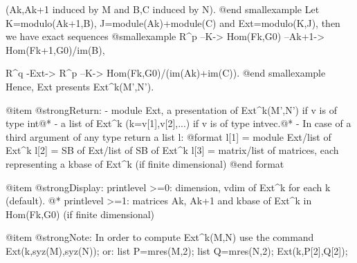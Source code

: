       (Ak,Ak+1 induced by M and B,C induced by N).
@end smallexample
Let K=modulo(Ak+1,B), J=module(Ak)+module(C) and Ext=modulo(K,J),
then we have exact sequences
@smallexample
    R^p --K-> Hom(Fk,G0) --Ak+1-> Hom(Fk+1,G0)/im(B),

    R^q -Ext-> R^p --K-> Hom(Fk,G0)/(im(Ak)+im(C)).
@end smallexample
Hence, Ext presents Ext^k(M',N').

@item @strong{Return:}
- module Ext, a presentation of Ext^k(M',N') if v is of type int@*
- a list of Ext^k (k=v[1],v[2],...) if v is of type intvec.@*
- In case of a third argument of any type return a list l:
@format
             l[1] = module Ext/list of Ext^k
             l[2] = SB of Ext/list of SB of Ext^k
             l[3] = matrix/list of matrices, each representing a kbase of Ext^k
                       (if finite dimensional)
@end format

@item @strong{Display:}
printlevel >=0: dimension, vdim of Ext^k for each k (default).
@* printlevel >=1: matrices Ak, Ak+1 and kbase of Ext^k in Hom(Fk,G0)
(if finite dimensional)

@item @strong{Note:}
In order to compute Ext^k(M,N) use the command Ext(k,syz(M),syz(N));
or: list P=mres(M,2); list Q=mres(N,2); Ext(k,P[2],Q[2]);

